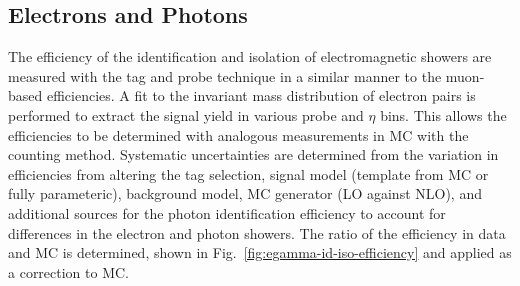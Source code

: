 \subsection{Electrons and Photons}

The efficiency of the identification and isolation of electromagnetic showers
are measured with the tag and probe technique in a similar manner to the
muon-based efficiencies. A fit to the invariant mass distribution of electron
pairs is performed to extract the signal yield in various probe \pt and $\eta$
bins. This allows the efficiencies to be determined with analogous
measurements in MC with the counting method. Systematic uncertainties are
determined from the variation in efficiencies from altering the tag selection,
signal model (template from MC or fully parameteric), background model, MC
generator (LO against NLO), and additional sources for the photon
identification efficiency to account for differences in the electron and
photon showers. The ratio of the efficiency in data and MC is determined,
shown in Fig.~\ref{fig:egamma-id-iso-efficiency} and applied as a correction
to MC.

